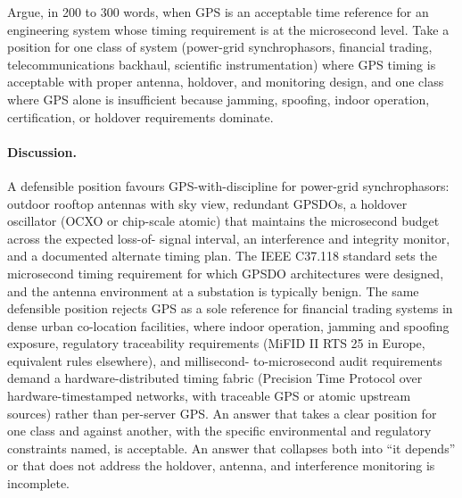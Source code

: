 \begin{exercise}
Argue, in 200 to 300 words, when GPS is an acceptable time
reference for an engineering system whose timing requirement is at
the microsecond level. Take a position for one class of system
(power-grid synchrophasors, financial trading, telecommunications
backhaul, scientific instrumentation) where GPS timing is
acceptable with proper antenna, holdover, and monitoring design,
and one class where GPS alone is insufficient because jamming,
spoofing, indoor operation, certification, or holdover
requirements dominate.

\paragraph{Discussion.}
A defensible position favours GPS-with-discipline for power-grid
synchrophasors: outdoor rooftop antennas with sky view, redundant
GPSDOs, a holdover oscillator (OCXO or chip-scale atomic) that
maintains the microsecond budget across the expected loss-of-
signal interval, an interference and integrity monitor, and a
documented alternate timing plan. The IEEE C37.118 standard sets
the microsecond timing requirement for which GPSDO architectures
were designed, and the antenna environment at a substation is
typically benign. The same defensible position rejects GPS as a
sole reference for financial trading systems in dense urban
co-location facilities, where indoor operation, jamming and
spoofing exposure, regulatory traceability requirements (MiFID II
RTS 25 in Europe, equivalent rules elsewhere), and millisecond-
to-microsecond audit requirements demand a hardware-distributed
timing fabric (Precision Time Protocol over hardware-timestamped
networks, with traceable GPS or atomic upstream sources) rather
than per-server GPS. An answer that takes a clear position for
one class and against another, with the specific environmental
and regulatory constraints named, is acceptable. An answer that
collapses both into ``it depends'' or that does not address the
holdover, antenna, and interference monitoring is incomplete.
\end{exercise}
